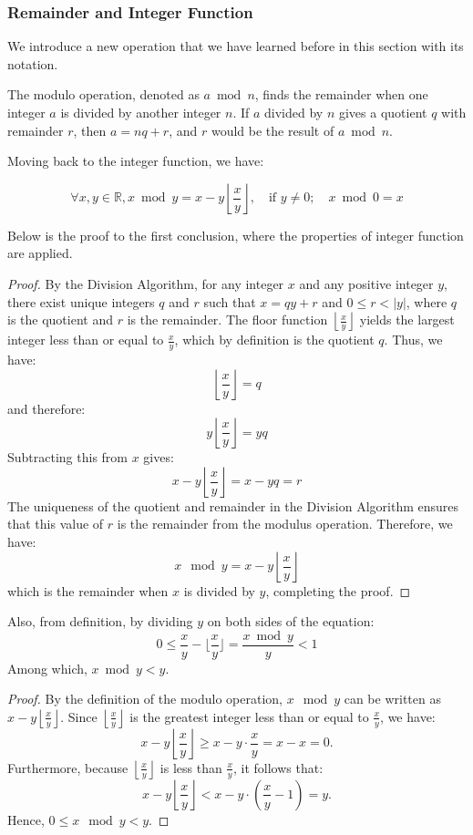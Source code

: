\documentclass[
	12pt, %
	fleqn, %
	a4paper, %
]{LegrandOrangeBook}
\begin{document}
\subsubsection{Remainder and Integer Function}
We introduce a new operation that we have learned before in this section with its notation.
\begin{notation}
    The modulo operation, denoted as \( a \bmod n \), finds the remainder when one integer \( a \) is divided by another integer \( n \). 
    If \( a \) divided by \( n \) gives a quotient \( q \) with remainder \( r \), then \( a = nq + r \), and \( r \) would be the result of \( a \bmod n \).
\end{notation}

Moving back to the integer function, we have:
\begin{theorem}
    $$\forall x, y \in \mathbb{R}, x \bmod y = x - y\left\lfloor \frac{x}{y} \right\rfloor, \quad \text{if } y \neq 0; \quad x \bmod 0 = x$$
\end{theorem}
Below is the proof to the first conclusion, where the properties of integer function are applied.
\begin{proof}
    By the Division Algorithm, for any integer \( x \) and any positive integer \( y \), there exist unique integers \( q \) and \( r \) such that \( x = qy + r \) and \( 0 \leq r < |y| \), where \( q \) is the quotient and \( r \) is the remainder. The floor function \( \left\lfloor \frac{x}{y} \right\rfloor \) yields the largest integer less than or equal to \( \frac{x}{y} \), which by definition is the quotient \( q \). Thus, we have:
\[
\left\lfloor \frac{x}{y} \right\rfloor = q
\]
and therefore:
\[
y\left\lfloor \frac{x}{y} \right\rfloor = yq
\]
Subtracting this from \( x \) gives:
\[
x - y\left\lfloor \frac{x}{y} \right\rfloor = x - yq = r
\]
The uniqueness of the quotient and remainder in the Division Algorithm ensures that this value of \( r \) is the remainder from the modulus operation. Therefore, we have:
\[
x \mod y = x - y\left\lfloor \frac{x}{y} \right\rfloor
\]
which is the remainder when \( x \) is divided by \( y \), completing the proof.

\end{proof}
Also, from definition, by dividing $y$ on both sides of the equation:
$$0\leq \frac{x}{y} - \lfloor\frac{x}{y}\rfloor = \frac{x \bmod y}{y} < 1$$
Among which, $x \bmod y <y$. 
\begin{proof}
    
        By the definition of the modulo operation, \( x \mod y \) can be written as \( x - y\left\lfloor \frac{x}{y} \right\rfloor \). Since \( \left\lfloor \frac{x}{y} \right\rfloor \) is the greatest integer less than or equal to \( \frac{x}{y} \), we have:
        \[
        x - y\left\lfloor \frac{x}{y} \right\rfloor \geq x - y \cdot \frac{x}{y} = x - x = 0.
        \]
        Furthermore, because \( \left \lfloor \frac{x}{y} \right\rfloor \) is less than \( \frac{x}{y} \), it follows that:
        \[
        x - y\left\lfloor \frac{x}{y} \right\rfloor < x - y \cdot \left(\frac{x}{y} - 1\right) = y.
        \]
        Hence, \( 0 \leq x \mod y < y \).

\end{proof}
\end{document}
